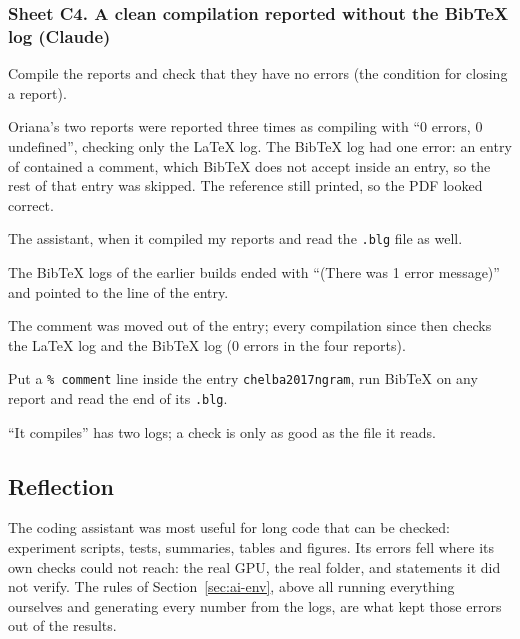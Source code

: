 \subsubsection*{Sheet C4. A clean compilation reported without the BibTeX log (Claude)}
\begin{description}[style=nextline,leftmargin=1.2em]
  \item[Prompt] Compile the reports and check that they have no errors (the condition for closing a report).
  \item[Faulty response] Oriana's two reports were reported three times as compiling with ``0 errors, 0
        undefined'', checking only the LaTeX log. The BibTeX log had one error: an entry of
         contained a comment, which BibTeX does not accept inside an entry, so the
        rest of that entry was skipped. The reference still printed, so the PDF looked correct.
  \item[Detected by] The assistant, when it compiled my reports and read the \texttt{.blg} file as well.
  \item[Proof] The BibTeX logs of the earlier builds ended with ``(There was 1 error message)'' and pointed to
        the line of the entry.
  \item[Correction] The comment was moved out of the entry; every compilation since then checks the LaTeX log
        and the BibTeX log (0 errors in the four reports).
  \item[Reproduction] Put a \texttt{\% comment} line inside the entry \texttt{chelba2017ngram}, run BibTeX on
        any report and read the end of its \texttt{.blg}.
  \item[Reflection] ``It compiles'' has two logs; a check is only as good as the file it reads.
\end{description}

\subsection*{Reflection}

The coding assistant was most useful for long code that can be checked: experiment scripts, tests,
summaries, tables and figures. Its errors fell where its own checks could not reach: the real GPU, the
real folder, and statements it did not verify. The rules of Section~\ref{sec:ai-env}, above all running
everything ourselves and generating every number from the logs, are what kept those errors out of the
results.
